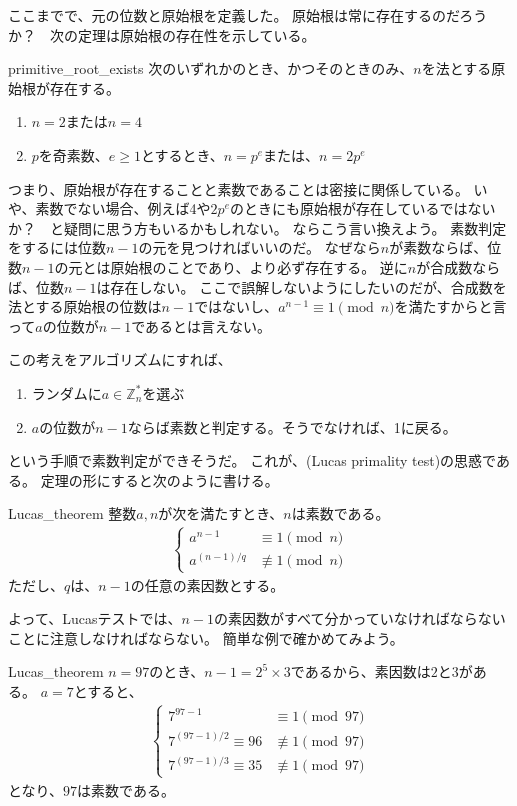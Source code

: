 ここまでで、元の位数と原始根を定義した。
原始根は常に存在するのだろうか？　次の定理は原始根の存在性を示している。

\begin{Prop}{}{primitive_root_exists}
次のいずれかのとき、かつそのときのみ、$n$を法とする原始根が存在する。
\begin{enumerate}
 \item $n=2$または$n=4$
 \item $p$を奇素数、$e\ge1$とするとき、$n=p^e$または、$n=2p^e$
\end{enumerate}
\end{Prop}

つまり、原始根が存在することと素数であることは密接に関係している。
いや、素数でない場合、例えば4や$2p^e$のときにも原始根が存在しているではないか？　と疑問に思う方もいるかもしれない。
ならこう言い換えよう。
素数判定をするには位数$n-1$の元を見つければいいのだ。
なぜなら$n$が素数ならば、位数$n-1$の元とは原始根のことであり、より必ず存在する。
逆に$n$が合成数ならば、位数$n-1$は存在しない。
ここで誤解しないようにしたいのだが、合成数を法とする原始根の位数は$n-1$ではないし、$a^{n-1}\equiv1\pmod{n}$を満たすからと言って$a$の位数が$n-1$であるとは言えない。

この考えをアルゴリズムにすれば、
\begin{enumerate}
 \item ランダムに$a\in\mathbb{Z}_n^*$を選ぶ
 \item $a$の位数が$n-1$ならば素数と判定する。そうでなければ、1に戻る。
\end{enumerate}
という手順で素数判定ができそうだ。
これが、(Lucas primality test)の思惑である。
定理の形にすると次のように書ける。

\begin{Theo}{}{Lucas_theorem}
整数$a,n$が次を満たすとき、$n$は素数である。
\begin{align*}
\begin{cases}
a^{n-1} &\equiv 1 \pmod{n}\\
a^{(n-1)/q} &\not\equiv 1 \pmod{n}
\end{cases}
\end{align*}
ただし、$q$は、$n-1$の任意の素因数とする。
\end{Theo}

よって、Lucasテストでは、$n-1$の素因数がすべて分かっていなければならないことに注意しなければならない。
簡単な例で確かめてみよう。

\begin{Exam}{}{Lucas_theorem}
$n=97$のとき、$n-1=2^5\times3$であるから、素因数は$2$と$3$がある。
$a=7$とすると、
\begin{align*}
\begin{cases}
7^{97-1} &\equiv 1 \pmod{97}\\
7^{(97-1)/2}  \equiv 96 &\not\equiv 1 \pmod{97}\\
7^{(97-1)/3}  \equiv 35 &\not\equiv 1 \pmod{97}
\end{cases}
\end{align*}
となり、$97$は素数である。
\end{Exam}

